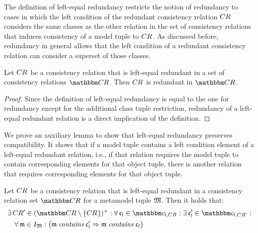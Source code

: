 The definition of left-equal redundancy restricts the notion of redundancy to cases in which the left condition of the redundant consistency relation $\consistencyrelation{CR}{}$ considers the same classes as the other relation in the set of consistency relations that induces consistency of a model tuple to $\consistencyrelation{CR}{}$.
As discussed before, redundancy in general allows that the left condition of a redundant consistency relation can consider a superset of those classes.

\begin{lemma} \label{lemma:leftequalredundancyimpliesredundancy}
    Let $\consistencyrelation{CR}{}$ be a consistency relation that is left-equal redundant in a set of consistency relations $\consistencyrelationset{CR}$. Then $\consistencyrelation{CR}{}$ is redundant in $\consistencyrelationset{CR}$.
\end{lemma}
\begin{proof}
    Since the definition of left-equal redundancy is equal to the one for redundancy except for the additional class tuple restriction, redundancy of a left-equal redundant relation is a direct implication of the definition.
\end{proof}

We prove an auxiliary lemma to show that left-equal redundancy preserves compatibility.
It shows that if a model tuple contains a left condition element of a left-equal redundant relation, i.e., if that relation requires the model tuple to contain corresponding elements for that object tuple, there is another relation that requires corresponding elements for that object tuple.

\begin{lemma} \label{lemma:leftequalredundancysubset}
    Let $\consistencyrelation{CR}{}$ be a consistency relation that is left-equal redundant in a consistency relation set $\consistencyrelationset{CR}$ for a metamodel tuple $\metamodeltuple{M}$. Then it holds that: 
    \begin{align*}
        &
        \exists \consistencyrelation{CR}{}' \in \transitiveclosure{(\consistencyrelationset{CR} \setminus \setted{\consistencyrelation{CR}{}})} : 
        \forall \conditionelement{c}{l} \in \condition{c}{l, \consistencyrelation{CR}{}} : 
        \exists \conditionelement{c}{l}' \in \condition{c}{l,\consistencyrelation{CR}{}'} : \\
        & \formulaskip
        \forall \modeltuple{m} \in \metamodeltupleinstanceset{M} : 
        \big(
            \modeltuple{m} \containsmath \conditionelement{c}{l}' \Rightarrow 
            \modeltuple{m} \containsmath \conditionelement{c}{l}
        \big)
    \end{align*}
\end{lemma}

